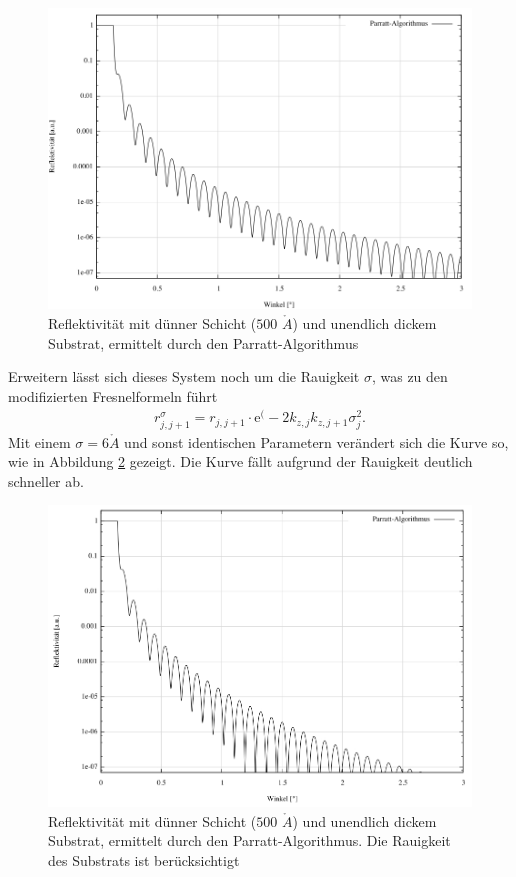 \begin{figure}[H]
 \includegraphics[width=\textwidth]{../pics/normal.jpg}
 \caption{Reflektivität mit dünner Schicht ($500$ $\mathring{A}$) und unendlich dickem Substrat, ermittelt durch den Parratt-Algorithmus}
 \label{pic_ReflNormal}
\end{figure}
\noindent
Erweitern lässt sich dieses System noch um die Rauigkeit $\sigma$, was zu den modifizierten Fresnelformeln führt
\begin{align}
 r^\sigma_{j,j+1} = r_{j,j+1} \cdot \text{e}^(-2k_{z,j}k_{z,j+1}\sigma_j^2.
\end{align}
Mit einem $\sigma = 6\mathring{A}$ und sonst identischen Parametern verändert sich die Kurve so, wie in Abbildung \ref{pic_ReflRau} gezeigt. Die Kurve fällt aufgrund
der Rauigkeit deutlich schneller ab.

\begin{figure}[H]
 \includegraphics[width=\textwidth]{../pics/rau.jpg}
 \caption{Reflektivität mit dünner Schicht ($500$ $\mathring{A}$) und unendlich dickem Substrat, ermittelt durch den Parratt-Algorithmus. Die Rauigkeit des Substrats ist berücksichtigt}
 \label{pic_ReflRau}
\end{figure}


